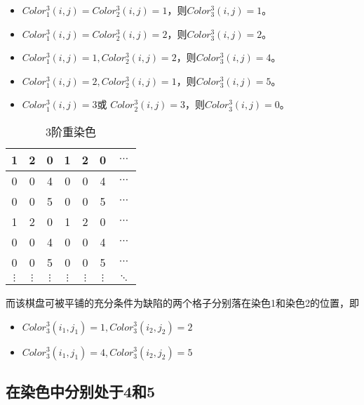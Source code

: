 \begin{itemize}
	\item $Color^3_1(i, j) = Color^3_2(i, j) = 1$，则$Color^3_3(i, j) = 1$。
	\item $Color^3_1(i, j) = Color^3_2(i, j) = 2$，则$Color^3_3(i, j) = 2$。
	\item $Color^3_1(i, j) = 1, Color^3_2(i, j) = 2$，则$Color^3_3(i, j) = 4$。
	\item $Color^3_1(i, j) = 2, Color^3_2(i, j) = 1$，则$Color^3_3(i, j) = 5$。
	\item $Color^3_1(i, j) = 3$或 $Color^3_2(i, j) = 3$，则$Color^3_3(i, j) = 0$。
\end{itemize}

\begin{table}[htbp]
	\centering
	\caption{3阶重染色}
	\begin{tabular}{|c|c|c|c|c|c|c|}
		\hline
		1        & 2        & 0        & 1        & 2        & 0        & $\cdots$ \\
		\hline
		0        & 0        & 4        & 0        & 0        & 4        & $\cdots$ \\
		\hline
		0        & 0        & 5        & 0        & 0        & 5        & $\cdots$ \\
		\hline
		1        & 2        & 0        & 1        & 2        & 0        & $\cdots$ \\
		\hline
		0        & 0        & 4        & 0        & 0        & 4        & $\cdots$ \\
		\hline
		0        & 0        & 5        & 0        & 0        & 5        & $\cdots$ \\
		\hline
		$\vdots$ & $\vdots$ & $\vdots$ & $\vdots$ & $\vdots$ & $\vdots$ & $\ddots$ \\
		\hline
	\end{tabular}
	\label{fig:3-order-staining-last}
\end{table}

而该棋盘可被平铺的充分条件为缺陷的两个格子分别落在染色1和染色2的位置，即

\begin{itemize}
	\item $Color^3_3(i_1, j_1) = 1, Color^3_3(i_2, j_2) = 2$
	\item $Color^3_3(i_1, j_1) = 4, Color^3_3(i_2, j_2) = 5$
\end{itemize}

\subsection{在染色中分别处于4和5}

